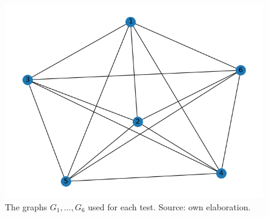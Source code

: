 \documentclass[11pt,a4paper,openright,oneside]{book}
\numberwithin{equation}{section}
\begin{document}
{\begin{figure}[H]
\begin{minipage}[t]{0.32\linewidth}
        \includegraphics[width=\linewidth]{media/graph-backprop-6.png}
        \caption*{$G_6$}
    \end{minipage}
    \caption{The graphs $G_1, \dots, G_6$ used for each test. Source: own elaboration.}
    \label{fig:ap-graphs}
\end{figure}

}
\end{document}

